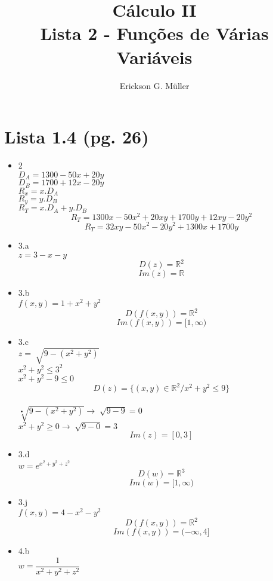 \documentclass{article}
\title{Cálculo II\\Lista 2 - Funções de Várias Variáveis}
\author{Erickson G. Müller}
\date{}
\begin{document}
\maketitle
\section*{Lista 1.4 (pg. 26)}
	\begin{itemize}
		\item 2
			\\$D_A=1300-50x+20y$
			\\$D_B=1700+12x-20y$
			\\$R_x=x.D_A$
			\\$R_y=y.D_B$
			\\$R_T=x.D_A+y.D_B$
			$$R_T = 1300x-50x^2+20xy+1700y+12xy-20y^2$$
			$$R_T = 32xy-50x^2-20y^2+1300x+1700y$$
		\item 3.a \\$z=3-x-y$ %
			$$D(z)=\mathbb{R}^2$$%
			$$Im(z) = \mathbb{R}$$ %
		\item 3.b \\$f(x,y) = 1+x^2+y^2$
			$$D(f(x,y)) = \mathbb{R}^2$$
			$$Im(f(x,y)) = [1,\infty)$$
		
		\item 3.c \\$z=\sqrt[ ]{9-(x^2+y^2)}$
		\\$x^2+y^2\leq 3^2$
		\\$x^2+y^2-9 \leq 0$
		$$D(z)=\{(x,y) \in \mathbb{R}^2 / x^2+y^2 \leq 9\}$$
		\\$\sqrt[•]{9-(x^2+y^2)} \to \sqrt[]{9-9}= 0$
		\\$x^2+y^2 \geq 0 \to \sqrt[]{9-0} = 3$
		$$Im(z) = [0,3]$$
		\item 3.d
		\\$w = e^{x^2+y^2+z^2}$
		$$D(w) = \mathbb{R}^3 $$		
		$$Im(w) = [1, \infty)$$
		\item 3.j
		\\$f(x,y) = 4-x^2-y^2$
		$$D(f(x,y)) = \mathbb{R}^2$$
		$$Im(f(x,y)) = (-\infty,4]$$
		\item 4.b
		\\$w = \dfrac{1}{x^2+y^2+z^2}$
		
	\end{itemize}
\end{document}
